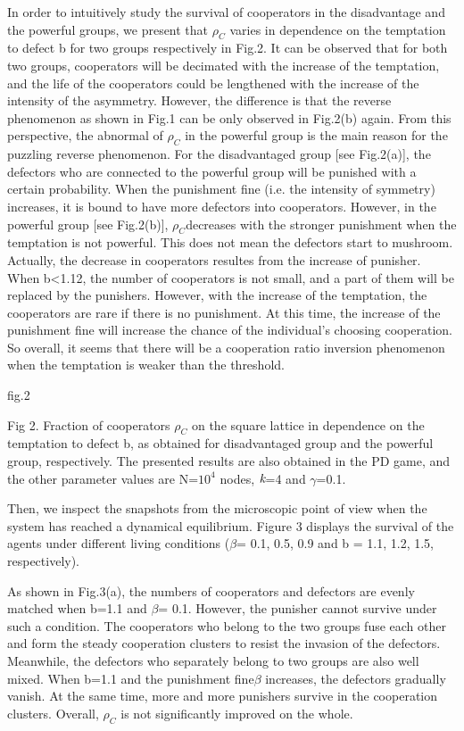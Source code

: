 \documentclass[%
 aip,
 amsmath,amssymb,
 reprint,%
]{revtex4-1}
\begin{document}
In order to intuitively study the survival of cooperators in the disadvantage and the powerful groups, we present that $\rho_C$ varies in dependence on the temptation to defect b for two groups respectively in Fig.2. It can be observed that for both two groups, cooperators will be decimated with the increase of the temptation, and the life of the cooperators could be lengthened with the increase of the intensity of the asymmetry. However, the difference is that the reverse phenomenon as shown in Fig.1 can be only observed in Fig.2(b) again. From this perspective, the abnormal of $\rho_C$ in the powerful group is the main reason for the puzzling reverse phenomenon. For the disadvantaged group [see Fig.2(a)], the defectors who are connected to the powerful group will be punished with a certain probability. When the punishment fine (i.e. the intensity of symmetry) increases, it is bound to have more defectors into cooperators. However, in the powerful group [see Fig.2(b)], $\rho_C$decreases with the stronger punishment when the temptation is not powerful. This does not mean the defectors start to mushroom. Actually, the decrease in cooperators resultes from the increase of punisher. When b<1.12, the number of cooperators is not small, and a part of them will be replaced by the punishers. However, with the increase of the temptation, the cooperators are rare if there is no punishment. At this time, the increase of the punishment fine will increase the chance of the individual's choosing cooperation. So overall, it seems that there will be a cooperation ratio inversion phenomenon when the temptation is weaker than the threshold.

fig.2

Fig 2. Fraction of cooperators $\rho_C$ on the square lattice in dependence on the temptation to defect b, as obtained for disadvantaged group and the powerful group, respectively. The presented results are also obtained in the PD game, and the other parameter values are N=$10^{4}$ nodes, $ \emph {k}$=4 and $\gamma$=0.1.

Then, we inspect the snapshots from the microscopic point of view when the system has reached a dynamical equilibrium. Figure 3 displays the survival of the agents under different living conditions ($\beta$= 0.1, 0.5, 0.9 and b = 1.1, 1.2, 1.5, respectively).

As shown in Fig.3(a), the numbers of cooperators and defectors are evenly matched when b=1.1 and $\beta$= 0.1. However, the punisher cannot survive under such a condition. The cooperators who belong to the two groups fuse each other and form the steady cooperation clusters to resist the invasion of the defectors. Meanwhile, the defectors who separately belong to two groups are also well mixed. When b=1.1 and the punishment fine$\beta$ increases, the defectors gradually vanish. At the same time, more and more punishers survive in the cooperation clusters. Overall, $\rho_C$ is not significantly improved on the whole.
\end{document}
